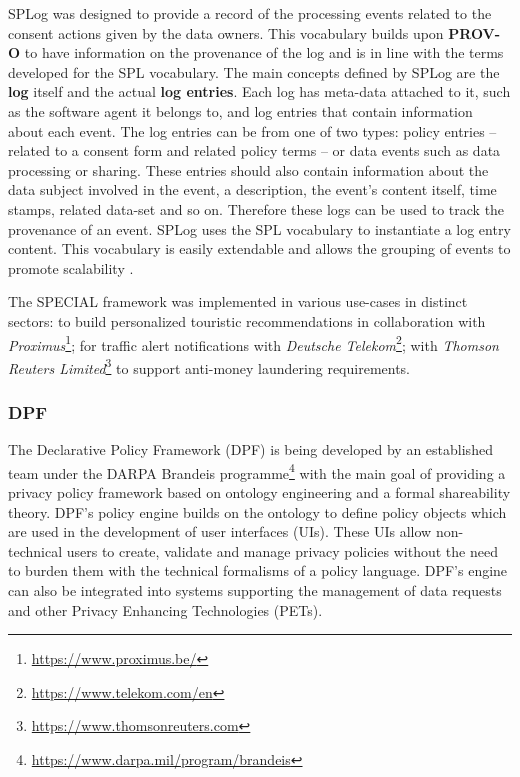 SPLog was designed to provide a record of the processing events related to the consent actions given by the data owners.
This vocabulary builds upon \textbf{PROV-O} \citep{lebo_prov-o_2013} to have information on the provenance of the log and is in line with the terms developed for the SPL vocabulary.
The main concepts defined by SPLog are the \textbf{log} itself and the actual \textbf{log entries}.
Each log has meta-data attached to it, such as the software agent it belongs to, and log entries that contain information about each event.
The log entries can be from one of two types: policy entries -- related to a consent form and related policy terms -- or data events such as data processing or sharing.
These entries should also contain information about the data subject involved in the event, a description, the event's content itself, time stamps, related data-set and so on.
Therefore these logs can be used to track the provenance of an event.
SPLog uses the SPL vocabulary to instantiate a log entry content.
This vocabulary is easily extendable and allows the grouping of events to promote scalability \citep{kirrane_transparency_2018}.

The SPECIAL framework was implemented in various use-cases in distinct sectors: to build personalized touristic recommendations in collaboration with \textit{Proximus}\footnote{\url{https://www.proximus.be/}}; for traffic alert notifications with \textit{Deutsche Telekom}\footnote{\url{https://www.telekom.com/en}}; with \textit{Thomson Reuters Limited}\footnote{\url{https://www.thomsonreuters.com}} to support anti-money laundering requirements.

\subsubsection{DPF}
\label{sec:dpf}

The Declarative  Policy Framework (DPF) \citep{martiny_protecting_2018, martiny_partial_2020} is being developed by an established team under the DARPA Brandeis programme\footnote{\url{https://www.darpa.mil/program/brandeis}} with the main goal of providing a privacy policy framework based on ontology engineering and a formal shareability theory.
DPF's policy engine builds on the ontology to define policy objects which are used in the development of user interfaces (UIs).
These UIs allow non-technical users to create, validate and manage privacy policies without the need to burden them with the technical formalisms of a policy language.
DPF's engine can also be integrated into systems supporting the management of data requests and other Privacy Enhancing Technologies (PETs).

